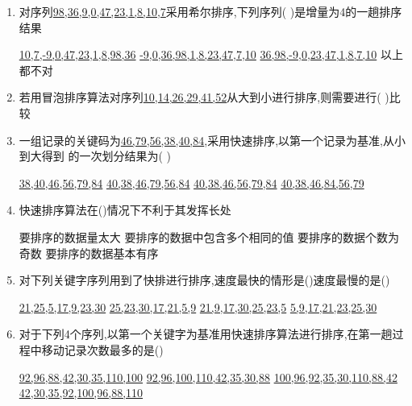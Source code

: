 \documentclass[12pt, a4paper, oneside, UTF8]{ctexbook}
\begin{document}
\begin{enumerate}
    \item 对序列\underline{98,36,9,0,47,23,1,8,10,7}采用希尔排序,下列序列( )是增量为4的一趟排序结果 
    \begin{choices}[2]
        \task \underline{10,7,-9,0,47,23,1,8,98,36}
        \task \underline{-9,0,36,98,1,8,23,47,7,10}
        \task \underline{36,98,-9,0,23,47,1,8,7,10}
        \task 以上都不对
    \end{choices}

    \item 若用冒泡排序算法对序列\underline{10,14,26,29,41,52}从大到小进行排序,则需要进行(  )比较 
    \begin{choices}
    \end{choices}

    \item 一组记录的关键码为\underline{46,79,56,38,40,84},采用快速排序,以第一个记录为基准,从小到大得到
    的一次划分结果为(   ) 
    \begin{choices}[2]
        \task \underline{38,40,46,56,79,84}
        \task \underline{40,38,46,79,56,84}
        \task \underline{40,38,46,56,79,84}
        \task \underline{40,38,46,84,56,79}
    \end{choices}

    \item 快速排序算法在()情况下不利于其发挥长处 
    \begin{choices}[2]
        \task 要排序的数据量太大
        \task 要排序的数据中包含多个相同的值
        \task 要排序的数据个数为奇数
        \task 要排序的数据基本有序
    \end{choices}

    \item 对下列关键字序列用到了快排进行排序,速度最快的情形是()速度最慢的是() 
    \begin{choices}[2]
        \task \underline{21,25,5,17,9,23,30}
        \task \underline{25,23,30,17,21,5,9}
        \task \underline{21,9,17,30,25,23,5}
        \task \underline{5,9,17,21,23,25,30}
    \end{choices}

    \item 对于下列4个序列,以第一个关键字为基准用快速排序算法进行排序,在第一趟过程中移动记录次数最多的是()
    \begin{choices}[2]
        \task \underline{92,96,88,42,30,35,110,100}
        \task \underline{92,96,100,110,42,35,30,88}
        \task \underline{100,96,92,35,30,110,88,42}
        \task \underline{42,30,35,92,100,96,88,110}
    \end{choices}



\end{enumerate}
\end{document}
